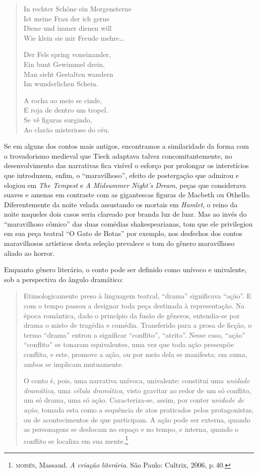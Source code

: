 \begin{verse}
In rechter Schöne ein Morgensterne\\
Ist meine Frau der ich gerne\\
Diene und immer dienen will\\
Wie klein sie mir Freude mehre\ldots{}

Der Fels spring voneinander,\\
Ein bunt Gewimmel drein,\\
Man sieht Gestalten wandern\\
Im wunderlichen Schein.

A rocha ao meio se cinde,\\
E roja de dentro um tropel.\\
Se vê figuras surgindo,\\
Ao clarão misterioso do céu.
\end{verse}

Se em alguns dos contos mais antigos, encontramos a similaridade da
forma com o trovadorismo medieval que Tieck adaptava talvez
concomitantemente, no desenvolvimento das narrativas fica visível o
esforço por prolongar os interstícios que introduzem, enfim, 
o ``maravilhoso'', efeito de postergação que admirou e elogiou em \textit{The Tempest} e
\textit{A Midsummer Night's Dream}, peças que considerava suaves e amenas em
contraste com as gigantescas figuras de Macbeth ou Othello.
Diferentemente da noite velada assustando os mortais em \textit{Hamlet}, o
reino da noite naqueles dois casos seria clareado por branda luz de
luar.  Mas ao invés do ``maravilhoso cômico'' das duas comédias
shakespearianas, tom que ele privilegiou em sua peça teatral ``O Gato de
Botas'' por exemplo, nos desfechos dos contos maravilhosos artísticos desta seleção
prevalece o tom do gênero maravilhoso aliado ao horror. 

Enquanto gênero literário, o conto pode ser definido como  unívoco e univalente, sob a perspectiva do ângulo dramático:

\begin{quote}
Etimologicamente preso à linguagem teatral,
``drama'' significava ``ação''. E com o tempo passou a designar
toda peça destinada à representação. Na época romântica, dado o
princípio da fusão de gêneros, entendia-se por drama o misto de
tragédia e comédia. Transferido para a prosa de ficção, o termo
``drama'' entrou a significar ``conflito'', ``atrito''. Nesse caso,
``ação'' ``conflito'' se tonaram equivalentes, uma vez que toda
ação pressupõe conflito, e este, promove a ação, ou por meio dela
se manifesta; em suma, ambos se implicam mutuamente.

O conto é, pois, uma narrativa unívoca, univalente: constitui
uma \textit{unidade dramática}, uma \textit{célula dramática}, visto gravitar ao
redor de um só conflito, um só drama, uma só ação. Caracteriza-se,
assim, por conter \textit{unidade de ação}, tomada esta como a sequência de atos praticados pelos protagonistas, ou de acontecimentos de
que participam. A ação pode ser externa, quando as personagens se
deslocam no espaço e no tempo, e interna, quando o conflito se
localiza em sua mente.\footnote{\textsc{moisés}, Massaud. \textit{A criação literária}. São Paulo: Cultrix, 2006, p.\,40.}
\end{quote}

